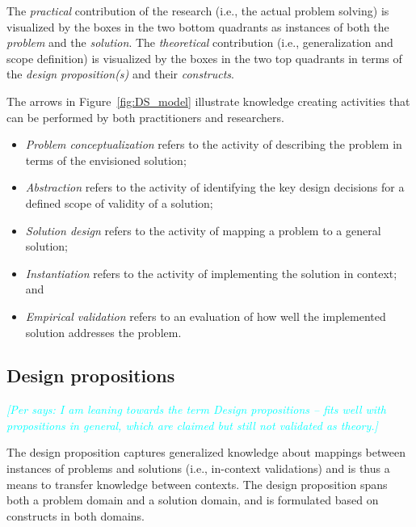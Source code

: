 \documentclass[graybox]{svmult}
\newcommand{\per}[1]{\textcolor{cyan}{{\it [Per says: #1]}}}
\newcommand{\per}[1]{}
\begin{document}
The \emph{practical} contribution of the research (i.e., the actual problem solving) is visualized by the boxes in the two bottom quadrants as instances of both the \emph{problem} and the \emph{solution}. The \emph{theoretical} contribution (i.e., generalization and scope definition) is visualized by the boxes in the two top quadrants in terms of the \emph{design proposition(s)} and their \emph{constructs}. 

The arrows in Figure~\ref{fig:DS_model} illustrate knowledge creating activities that can be performed by both practitioners and researchers. 
\begin{itemize}
\item \emph{Problem conceptualization} refers to the activity of describing the problem in terms of the envisioned solution; 
\item \emph{Abstraction} refers to the activity of identifying the key design decisions for a defined scope of validity of a solution; 
\item \emph{Solution design} refers to the activity of mapping a problem to a general solution; 
\item \emph{Instantiation} refers to the activity of implementing the solution in context; and 
\item \emph{Empirical validation} refers to an evaluation of how well the implemented solution addresses the problem.
\end{itemize}






\subsection{Design propositions}
\label{sec:technologicalrules}

\per{I am leaning towards the term Design propositions -- fits well with propositions in general, which are claimed but still not validated as theory.}

The design proposition captures generalized knowledge about mappings between instances of problems and solutions (i.e., in-context validations) and is thus a means to transfer knowledge between contexts. The design proposition spans both a problem domain and a solution domain, and is formulated based on constructs in both domains. 
\end{document}
